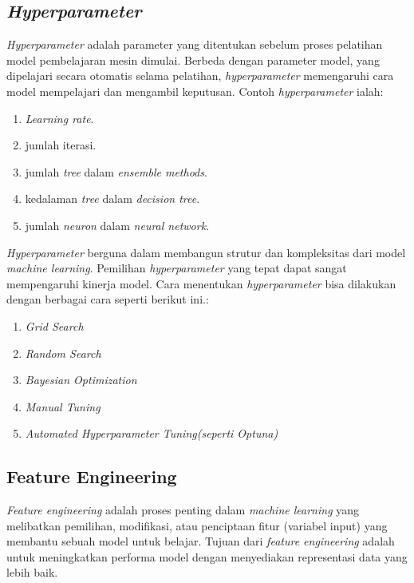 \subsection{\textit{Hyperparameter}} \label{II.hyperparameter}
\textit{Hyperparameter} adalah parameter yang ditentukan sebelum proses pelatihan model pembelajaran mesin dimulai\cite{yang2020hyperparameter}. Berbeda dengan parameter model, yang dipelajari secara otomatis selama pelatihan, \textit{hyperparameter} memengaruhi cara model mempelajari dan mengambil keputusan\cite{bischl2023hyperparameter}. Contoh \textit{hyperparameter} ialah:
\begin{enumerate}[noitemsep]
    \item \textit{Learning rate}.
    \item jumlah iterasi.
    \item jumlah \textit{tree} dalam \textit{ensemble methods}.
    \item kedalaman \textit{tree} dalam \textit{decision tree}.
    \item jumlah \textit{neuron} dalam \textit{neural network}.
\end{enumerate}
\textit{Hyperparameter} berguna dalam membangun strutur dan kompleksitas dari model \textit{machine learning}. Pemilihan \textit{hyperparameter} yang tepat dapat sangat mempengaruhi kinerja model\cite{bischl2023hyperparameter}. Cara menentukan \textit{hyperparameter} bisa dilakukan dengan berbagai cara seperti berikut ini.\cite{yang2020hyperparameter}:
\begin{enumerate}[noitemsep]
    \item \textit{Grid Search}
    \item \textit{Random Search}
    \item \textit{Bayesian Optimization}
    \item \textit{Manual Tuning}
    \item \textit{Automated Hyperparameter Tuning(seperti Optuna)}
\end{enumerate}

\subsection{Feature Engineering} \label{II.featureengineering}
\textit{Feature engineering} adalah proses penting dalam \textit{machine learning} yang melibatkan pemilihan, modifikasi, atau penciptaan fitur (variabel input) yang membantu sebuah model untuk belajar\cite{alpaydin2021machine}. Tujuan dari \textit{feature engineering} adalah untuk meningkatkan performa model dengan menyediakan representasi data yang lebih baik\cite{alpaydin2021machine}.   

